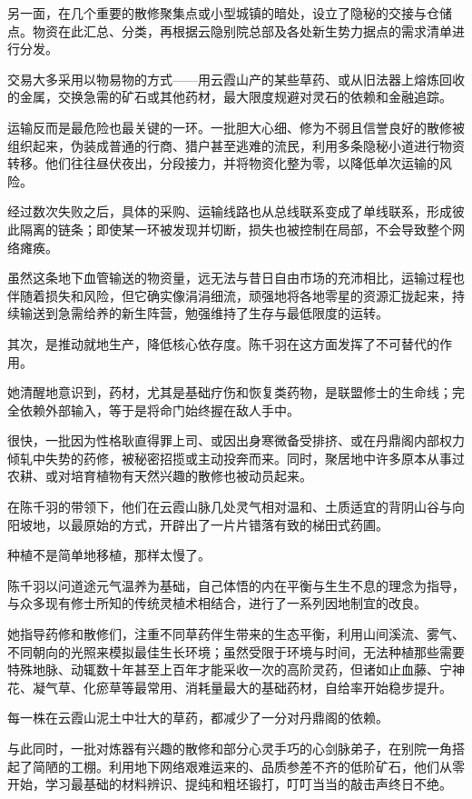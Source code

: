 另一面，在几个重要的散修聚集点或小型城镇的暗处，设立了隐秘的交接与仓储点。物资在此汇总、分类，再根据云隐别院总部及各处新生势力据点的需求清单进行分发。

交易大多采用以物易物的方式——用云霞山产的某些草药、或从旧法器上熔炼回收的金属，交换急需的矿石或其他药材，最大限度规避对灵石的依赖和金融追踪。

运输反而是最危险也最关键的一环。一批胆大心细、修为不弱且信誉良好的散修被组织起来，伪装成普通的行商、猎户甚至逃难的流民，利用多条隐秘小道进行物资转移。他们往往昼伏夜出，分段接力，并将物资化整为零，以降低单次运输的风险。

经过数次失败之后，具体的采购、运输线路也从总线联系变成了单线联系，形成彼此隔离的链条；即使某一环被发现并切断，损失也被控制在局部，不会导致整个网络瘫痪。

虽然这条地下血管输送的物资量，远无法与昔日自由市场的充沛相比，运输过程也伴随着损失和风险，但它确实像涓涓细流，顽强地将各地零星的资源汇拢起来，持续输送到急需给养的新生阵营，勉强维持了生存与最低限度的运转。

其次，是推动就地生产，降低核心依存度。陈千羽在这方面发挥了不可替代的作用。

她清醒地意识到，药材，尤其是基础疗伤和恢复类药物，是联盟修士的生命线；完全依赖外部输入，等于是将命门始终握在敌人手中。

很快，一批因为性格耿直得罪上司、或因出身寒微备受排挤、或在丹鼎阁内部权力倾轧中失势的药修，被秘密招揽或主动投奔而来。同时，聚居地中许多原本从事过农耕、或对培育植物有天然兴趣的散修也被动员起来。

在陈千羽的带领下，他们在云霞山脉几处灵气相对温和、土质适宜的背阴山谷与向阳坡地，以最原始的方式，开辟出了一片片错落有致的梯田式药圃。

种植不是简单地移植，那样太慢了。

陈千羽以问道途元气温养为基础，自己体悟的内在平衡与生生不息的理念为指导，与众多现有修士所知的传统灵植术相结合，进行了一系列因地制宜的改良。

她指导药修和散修们，注重不同草药伴生带来的生态平衡，利用山间溪流、雾气、不同朝向的光照来模拟最佳生长环境；虽然受限于环境与时间，无法种植那些需要特殊地脉、动辄数十年甚至上百年才能采收一次的高阶灵药，但诸如止血藤、宁神花、凝气草、化瘀草等最常用、消耗量最大的基础药材，自给率开始稳步提升。

每一株在云霞山泥土中壮大的草药，都减少了一分对丹鼎阁的依赖。

与此同时，一批对炼器有兴趣的散修和部分心灵手巧的心剑脉弟子，在别院一角搭起了简陋的工棚。利用地下网络艰难运来的、品质参差不齐的低阶矿石，他们从零开始，学习最基础的材料辨识、提纯和粗坯锻打，叮叮当当的敲击声终日不绝。

